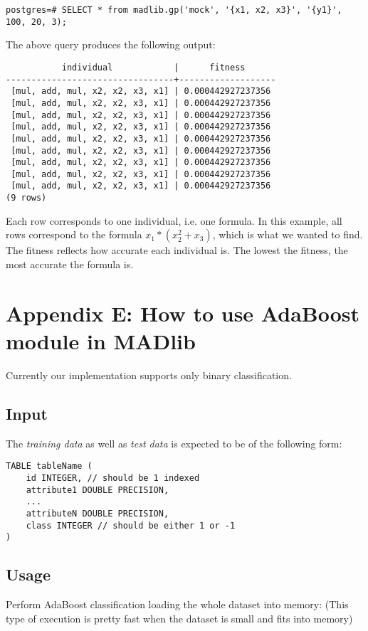 \begin{verbatim}
postgres=# SELECT * from madlib.gp('mock', '{x1, x2, x3}', '{y1}', 100, 20, 3);
\end{verbatim}

{\raggedleft The above query produces the following output:}
\begin{verbatim}
           individual            |      fitness
---------------------------------+-------------------
 [mul, add, mul, x2, x2, x3, x1] | 0.000442927237356
 [mul, add, mul, x2, x2, x3, x1] | 0.000442927237356
 [mul, add, mul, x2, x2, x3, x1] | 0.000442927237356
 [mul, add, mul, x2, x2, x3, x1] | 0.000442927237356
 [mul, add, mul, x2, x2, x3, x1] | 0.000442927237356
 [mul, add, mul, x2, x2, x3, x1] | 0.000442927237356
 [mul, add, mul, x2, x2, x3, x1] | 0.000442927237356
 [mul, add, mul, x2, x2, x3, x1] | 0.000442927237356
 [mul, add, mul, x2, x2, x3, x1] | 0.000442927237356
(9 rows)
\end{verbatim}

{\raggedleft Each row corresponds to one individual, i.e. one formula. In this example, all rows correspond to the formula $x_1*(x_2^2+x_3)$, which is what we wanted to find. The fitness reflects how accurate each individual is. The lowest the fitness, the most accurate the formula is.}


\section*{Appendix E: How to use AdaBoost module in MADlib}
\label{sec:adaapp}
Currently our implementation supports only binary classification.

\subsection*{Input}
The {\itshape training data} as well as {\itshape test data} is expected to be of the following form:

\begin{verbatim}
TABLE tableName (
    id INTEGER, // should be 1 indexed
    attribute1 DOUBLE PRECISION,
    ...
    attributeN DOUBLE PRECISION,
    class INTEGER // should be either 1 or -1
)
\end{verbatim}

\subsection*{Usage}
Perform AdaBoost classification loading the whole dataset into memory: (This type of execution is pretty fast when the dataset is small and fits into memory)

